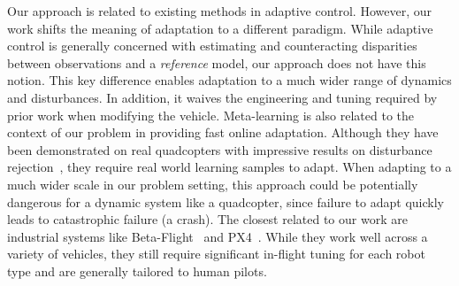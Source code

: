 Our approach is related to existing methods in adaptive control.
%
However, our work shifts the meaning of adaptation to a different paradigm.
%
While adaptive control is generally concerned with estimating and counteracting disparities between observations and a \emph{reference} model, our approach does not have this notion. %
%
This key difference enables adaptation to a much wider range of dynamics and disturbances.
%
In addition, it waives the engineering and tuning required by prior work when modifying the vehicle.
%
Meta-learning is also related to the context of our problem in providing fast online adaptation.
%
Although they have been demonstrated on real quadcopters with impressive results on disturbance rejection~\cite{belkhale2021model,neuralfly}, they require real world learning samples to adapt.
%
When adapting to a much wider scale in our problem setting, this approach could be potentially dangerous for a dynamic system like a quadcopter, since failure to adapt quickly leads to catastrophic failure (a crash).
%
The closest related to our work are industrial systems like Beta-Flight~\cite{BetaFlight} and PX4~\cite{PX4}.
%
While they work well across a variety of vehicles, they still require significant in-flight tuning for each robot type and are generally tailored to human pilots.
%
